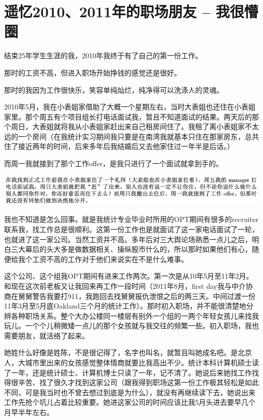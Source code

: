 \documentclass[9pt, b5paper]{article}
\begin{document}
\section{遥忆2010、2011年的职场朋友 -- 我很懵圈}
\label{sec:orgc099b77}

结束25年学生生涯的我，2010年我终于有了自己的第一份工作。

那时的工资不高，但进入职场开始挣钱的感觉还是很好。 

那时的我因为工作很快乐，笑容单纯灿烂，纯净得可以洗涤人的灵魂。

2010年5月，我在小表姐家借助了大概一个星期左右，当时大表姐也还住在小表姐家里。那个周五有个项目组长打电话面试我，暂且不知道面试的结果。两天后的那个周日，大表姐就将我从小表姐家赶出来自己租房间住了。我租了离小表姐家不太远的一个房间（在我统计实习期间我只要是在南湾我就基本只住在那家房东，总共住了接近两年的时间，后来多年后我结婚后又去他家住过一年半是后话。）

而周一我就接到了那个工作offer，是我只进行了一个面试就拿到手的。

\begin{center}
\includegraphics[width=.9\linewidth]{./pic/p1p47-3.png}
\end{center}

我也不知道是怎么回事。就是我统计专业毕业时所用的OPT期间有很多的recruiter联系我，找工作总是很顺利。这第一份工作也是就面试了这一家电话面试了一轮，也就进了这一家公司。当然工资并不高。多年后对三大舆论场熟悉一点儿之后，明白三大幕后的头大多是做数据相关、操纵股巿什么的，所以那时如果他们有心，随便给我个工资不高的工作对于他们来说实在不是什么难事。 

这个公司、这个组我OPT期间有进来工作两次。第一次是从10年5月至11年2月。和现在这次前老板又让我回来再工作一段时间（2011年8月，first day我与中介协商在舅舅警告我要打911，我跑回去找舅舅报仇泄恨之后的两三天。中间过渡一份11年3月至5月底Oakland三个月的统计工作）。那时初入职场，并不能很清楚地分辨各种职场关系。整个大办公楼同一楼层有别外一个组的一两个年轻女孩儿来找我玩儿。一个个儿稍微矮一点儿的那个女孩就与我交往的频繁一些。初入职场，我也需要朋友，就活络了起来。

她姓什么好像是姓陈，不是很记得了，名字也叫名，就暂且叫她成名吧。是北京人，大城市里出来的女孩感觉整体情商就要比我高出不少。统计本科计算机硕士读了一年，还是统计硕士、计算机博士只读了一年，记不清了。她说后来她找工作找得很辛苦、找了很久才找到这家公司（跟我得到职场这第一份工作极其轻松是如此不同，可是我当时也不曾去想过到底是为什么），就没有再继续读下去，她说出来工作先抢个坑儿占着比较重要。她进这家公司的时间应该比我5月头进去要早几个月早半年左右。
\end{document}
